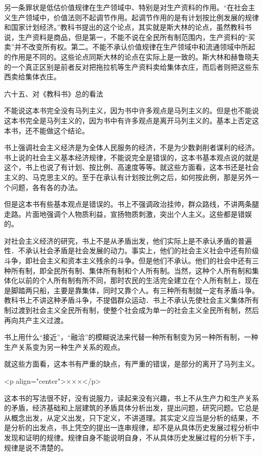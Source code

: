 另一条罪状是低估价值规律在生产领域中、特别是对生产资料的作用。“在社会主义生产领域中，价值法则不起调节作用。起调节作用的是有计划按比例发展的规律和国家计划经济。”教科书提出的这个论点，其实就是斯大林的论点，虽然教科书说，生产资料是商品，但是第一，不能不说在全民所有制范围内，生产资料的“买卖”并不改变所有权。第二。不能不承认价值规律在生产领域中和流通领域中所起的作用是不同的。这些论点同斯大林的论点在实际上是一致的。斯大林和赫鲁晓夫的一个真正区别是前者反对把拖拉机等生产资料卖给集体衣庄，而后者则把这些东西卖给集体衣庄。

六十五、对《教科书》总的看法

不能说这本书完全没有马列主义，因为书中许多观点是马列主义的。但是也不能说这本书完全是马列主义的，因为书中有许多观点是离开马列主义的。基本上否定这本书，还不能做这个结论。

书上强调社会主义经济是为全体人民服务的经济，不是为少数剥削者谋利的经济。书上说的社会主义基本经济规律，不能说完全是错误的，这本书基本观点说的就是这个，书上也说了有计划、按比例、高速度等等。就这些方面看，这本书还是社会主义的、马克思主义的。至于在承认有计划按比例之后，如何按此例，那是另外一个问题，各有各的办法。

但是这本书有些基本观点是错误的。书上不强调政治挂帅，群众路线，不讲两条腿走路。片面地强调个人物质利益，宣扬物质刺激，突出个人主义。这些都是错娱的。

对社会主义经济的研究，书上不是从矛盾出发，他们实际上是不承认矛盾的普遍性．不承认社会矛盾是社会发展的动力。事实上，他们的社会主义社会中还有阶级斗争，即社会主义和资本主义残余的斗争。但是他们不承认。他们的社会中还有三种所有制，即全民所有制、集体所有制和个人所有制。当然，这种个人所有制和集体化以前的个人所有制有所不同，那时农民的生活完全建立在个人所有制上，现在是脚踏两只船，主要是靠集体，同时又靠个人。有三种所有制就一定有矛盾斗争。教科书上不讲这种矛盾斗争，不提倡群众运动．书上不承认先使社会主义集体所有制过渡到社会主义全民所有制，使整个社会成为单一的社会主义全民所有制，然后再向共产主义过渡。

书上用什么“接近”，“融洽”的模糊说法来代替一种所有制变为另一种所有制，一种生产关系变为另一种生产关系的观点。

就这些方面看，这本书有严重的缺点，有严重的错误，是部分的离开了马列主义。

<p align="center">×××</p>

这本书的写法很不好，没有说服力，读起来没有兴趣，书上不从生产力和生产关系的矛盾，经济基础和上层建筑的矛盾具体分析出发，提出问题，研究问题。它总是从概念出发，从定义出发，只下定义，不讲道理。其实定义应当是分析的结果，不是分析的出发点，书上凭空的提出一连串规律，却不是从具体历史发展过程分析中发现和证明的规律。规律自身不能说明自身，不从具体历史发展过程的分析下手，规律是说不清楚的。

